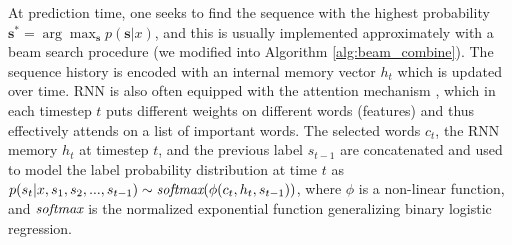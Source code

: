 At prediction time, one seeks to find the sequence with the highest probability $\mathbf{s}^*=\arg\max_\mathbf{s} p(\mathbf{s}|x)$, and this is usually implemented approximately with a beam search procedure \cite{lowerre1976harpy} (we modified into Algorithm \ref{alg:beam_combine}). The sequence history is encoded with an internal memory vector $h_t$ which is updated over time. RNN is also often equipped with the attention mechanism \cite{DBLP:journals/corr/BahdanauCB14}, which in each timestep $t$ puts different weights on different words (features) and thus effectively attends on a list of important words.  The selected words $c_t$, the RNN memory $h_t$ at timestep $t$, and the previous label ${s_{t-1}}$ are concatenated and used to model the label probability distribution at time $t$ as $p(s_t|x,s_1,s_2,...,s_{t-1}) \sim  \textit{softmax}(\phi(c_t,h_t,s_{t-1}))$, where $\phi$ is a non-linear function, and $\textit{softmax}$ is the normalized exponential function generalizing binary logistic regression. %


